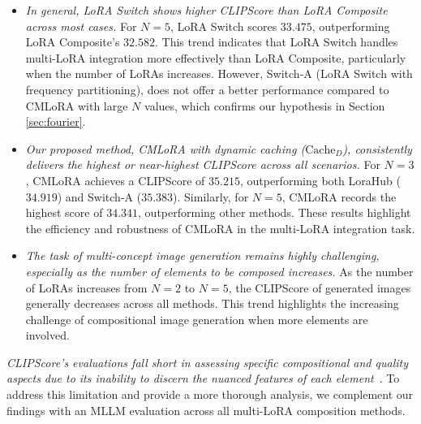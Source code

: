 \begin{itemize}[noitemsep, topsep=-5pt, leftmargin=*]
    \item \textit{In general, LoRA Switch shows higher CLIPScore than LoRA Composite across most cases.} For $N=5$, LoRA Switch scores $33.475$, outperforming LoRA Composite's $32.582$. This trend indicates that LoRA Switch handles multi-LoRA integration more effectively than LoRA Composite, particularly when the number of LoRAs increases. However, Switch-A (LoRA Switch with frequency partitioning), does not offer a better performance compared to CMLoRA with large $N$ values, which confirms our hypothesis in Section \ref{sec:fourier}.
    \item \textit{Our proposed method, CMLoRA with dynamic caching ($\text{Cache}_{D}$), consistently delivers the highest or near-highest CLIPScore across all scenarios.} For $N=3$, CMLoRA achieves a CLIPScore of $35.215$, outperforming both LoraHub ($34.919$) and Switch-A ($35.383$). Similarly, for $N=5$, CMLoRA records the highest score of $34.341$, outperforming other methods. These results highlight the efficiency and robustness of CMLoRA in the multi-LoRA integration task.
    \item \textit{The task of multi-concept image generation remains highly challenging, especially as the number of elements to be composed increases.} As the number of LoRAs increases from $N=2$ to $N=5$, the CLIPScore of generated images generally decreases across all methods. This trend highlights the increasing challenge of compositional image generation when more elements are involved.
\end{itemize}


\textit{CLIPScore’s evaluations fall short in assessing specific compositional and quality aspects due to its inability to discern the nuanced features of each element}~\citep{multilora}. To address this limitation and provide a more thorough analysis, we complement our findings with an MLLM evaluation across all multi-LoRA composition methods.
\vspace{-4pt}
